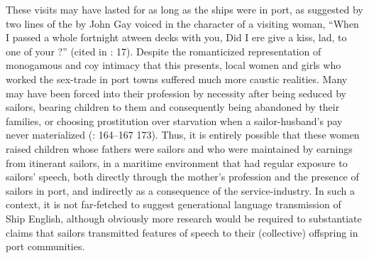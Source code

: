 These visits may have lasted for as long as the ships were in port, as suggested by two lines of the  by John Gay voiced in the character of a visiting woman, “When I passed a whole fortnight atween decks with you, Did I ere give a kiss, lad, to one of your ?” (cited in \citealt{Hugill1969}: 17). Despite the romanticized representation of monogamous and coy intimacy that this  presents, local women and girls who worked the sex-trade in port towns suffered much more caustic realities. Many may have been forced into their profession by necessity after being seduced by sailors, bearing children to them and consequently being abandoned by their families, or choosing prostitution over starvation when a sailor-husband’s pay never materialized (\citealt{AdkinsAdkins2008}: 164--167 173). Thus, it is entirely possible that these women raised children whose fathers were sailors and who were maintained by earnings from itinerant sailors, in a maritime environment that had regular exposure to sailors’ speech, both directly through the mother’s profession and the presence of sailors in port, and indirectly as a consequence of the service-industry. In such a context, it is not far-fetched to suggest generational language transmission of Ship English, although obviously more research would be required to substantiate claims that sailors transmitted features of speech to their (collective) offspring in port communities. 

